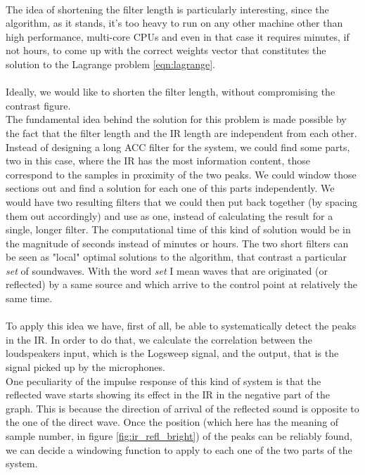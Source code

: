 \\
The idea of shortening the filter length is particularly interesting, since the algorithm, as it stands, it's too heavy to run on any other machine other than high performance, multi-core CPUs and even in that case it requires minutes, if not hours, to come up with the correct weights vector that constitutes the solution to the Lagrange problem \ref{eqn:lagrange}.
\\
\\
Ideally, we would like to shorten the filter length, without compromising the contrast figure.
\\
The fundamental idea behind the solution for this problem is made possible by the fact that the filter length and the IR length are independent from each other. Instead of designing a long ACC filter for the system, we could find some parts, two in this case, where the IR has the most information content, those correspond to the samples in proximity of the two peaks. We could window those sections out and find a solution for each one of this parts independently. We would have two resulting filters that we could then put back together (by spacing them out accordingly) and use as one, instead of calculating the result for a single, longer filter. The computational time of this kind of solution would be in the magnitude of seconds instead of minutes or hours. The two short filters can be seen as "local" optimal solutions to the algorithm, that contrast a particular \textit{set} of soundwaves. With the word \textit{set} I mean waves that are originated (or reflected) by a same source and which arrive to the control point at relatively the same time.
\\
\\
To apply this idea we have, first of all, be able to systematically detect the peaks in the IR. In order to do that, we calculate the correlation between the loudspeakers input, which is the Logsweep signal, and the output, that is the signal picked up by the microphones. \\
One peculiarity of the impulse response of this kind of system is that the reflected wave starts showing its effect in the IR in the negative part of the graph. This is because the direction of arrival of the reflected sound is opposite to the one of the direct wave. Once the position (which here has the meaning of sample number, in figure \ref{fig:ir_refl_bright}) of the peaks can be reliably found, we can decide a windowing function to apply to each one of the two parts of the system.
\\
